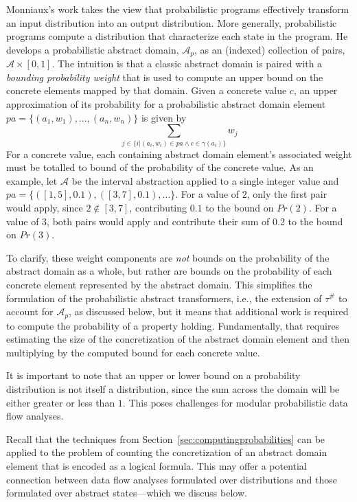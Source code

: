 Monniaux's work takes the view that probabilistic programs 
effectively transform an input distribution into an output
distribution.  More generally, probabilistic programs compute a distribution that
characterize each state in the program.   
He develops a probabilistic abstract domain, $\mathcal{A}_p$, 
as an (indexed) collection of pairs, $\mathcal{A} \times [0,1]$.
The intuition is that a classic abstract domain is paired
with a \textit{bounding probability weight} that is used
to compute an upper bound on the concrete elements mapped
by that domain.
Given a concrete value $c$, 
an upper approximation of its probability 
for a probabilistic abstract domain
element $pa = \{(a_1,w_1), ..., (a_n,w_n)\}$
is given by
\[
\sum_{j \in \{ i \vert (a_i,w_i) \in pa \wedge c \in \gamma(a_i)\}} w_j
\]
For a concrete value, each containing abstract
domain element's associated weight must be totalled
to bound of the probability of the concrete value.
As an example, let $\mathcal{A}$ be the interval abstraction
applied to a single integer value
and $pa = \{([1,5],0.1),([3,7],0.1),\ldots\}$.  
For a value of $2$, only the first pair would apply, since
$2 \not\in [3,7]$, contributing $0.1$ to the bound on $Pr(2)$.
For a value of $3$, both pairs would apply and contribute
their sum of $0.2$ to the bound on $Pr(3)$.

To clarify, these weight components are \textit{not} bounds on the probability
of the abstract domain as a whole, but rather are bounds on the probability
of each concrete element represented by the abstract domain.
This simplifies the formulation of the probabilistic abstract
transformers, i.e., the extension of $\tau^\#$ to account for 
$\mathcal{A}_p$, as discussed below, but it means that additional
work is required to compute the probability of a property holding.
Fundamentally, that requires estimating the size of the concretization
of the abstract domain element and then multiplying by the computed bound for
each concrete value.  

It is important to note that an upper or lower
bound on a probability distribution
is not itself a distribution, since the sum across the domain
will be either greater or less than $1$.
This poses challenges for modular probabilistic data flow analyses.

Recall that the techniques from 
Section~\ref{sec:computingprobabilities} can be applied to
the problem of counting the concretization of an abstract domain element 
that is encoded as a logical formula.  This may offer a potential
connection between data flow analyses formulated over distributions
and those formulated over abstract states---which we discuss below.

